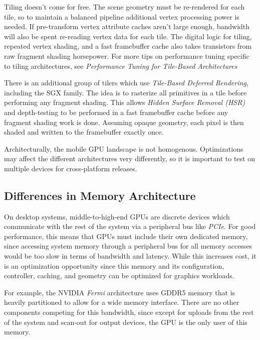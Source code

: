 Tiling doesn't come for free.  The scene geometry must be re-rendered for each tile, so to maintain a balanced pipeline additional vertex processing power is needed.  If pre-transform vertex attribute caches aren't large enough, bandwidth will also be spent re-reading vertex data for each tile.  The digital logic for tiling, repeated vertex shading, and a fast framebuffer cache also takes transistors from raw fragment shading horsepower.  For more tips on performance tuning specific to tiling architectures, see \textit{Performance Tuning for Tile-Based Architectures} \cite{Chapter TODO}

 There is an additional group of tilers
which use \textit{Tile-Based Deferred Rendering}, including the SGX family.
The idea is to rasterize all primitives in a tile before performing any
fragment shading.  This allows \textit{Hidden Surface Removal (HSR)} and
depth-testing to be performed in a fast framebuffer cache before any fragment
shading work is done.  Assuming opaque geometry, each pixel is then shaded and
written to the framebuffer exactly once.

Architecturally, the mobile GPU landscape is not homogenous.  Optimizations may
affect the different architectures very differently, so it is important to test
on multiple devices for cross-platform releases.  \subsection{Differences in
Memory
Architecture}\label{Jon-McCaffrey:differences-in-memory-architecture}

On desktop systems, middle-to-high-end GPUs are discrete devices which
communicate with the rest of the system via a peripheral bus like
\textit{PCIe}.  For good performance, this means that GPUs must include their
own dedicated memory, since accessing system memory through a peripheral bus
for all memory accesses would be too slow in terms of bandwidth and latency.
While this increases cost, it is an optimization opportunity since this memory and 
its configuration, controller, caching, and geometry
can be optimized for graphics workloads.

For example, the NVIDIA \textit{Fermi} architecture uses GDDR5 memory that is
heavily partitioned \cite{Walton10} to allow for a wide memory interface.
There are no other components competing for this bandwidth, since except for
uploads from the rest of the system and scan-out for output devices, the GPU is
the only user of this memory.

